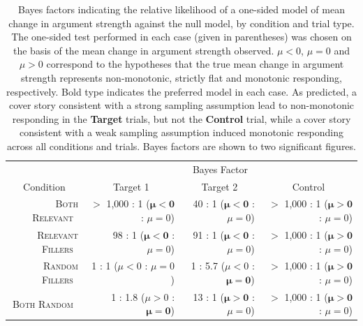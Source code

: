 \documentclass[doc,12pt]{apa}
\newcommand{\relevant}{\textsc{Both Relevant}}
\newcommand{\relevantdata}{\textsc{Relevant Fillers}}
\newcommand{\randomdata}{\textsc{Random Fillers}}
\newcommand{\random}{\textsc{Both Random}}
\newcommand{\monowin}[2]{{#1} : {#2} \scriptsize{($\bm{\mu > 0}$ : $\mu=0$)}}
\newcommand{\monolose}[2]{{#1} : {#2} \scriptsize{($\mu > 0$ : $\bm{\mu=0}$)}}
\newcommand{\nonmonowin}[2]{{#1} : {#2} \scriptsize{($\bm{\mu<0}$ : $\mu=0$)}}
\newcommand{\nonmonolose}[2]{{#1} : {#2} \scriptsize{($\mu<0$ : $\bm{\mu=0}$)}}
\newcommand{\nonmonodraw}[2]{{#1} : {#2} \scriptsize{($\mu<0$ : $\mu=0$)}}
\begin{document}
\begin{table}[t]
\hspace{-5mm}
\footnotesize
\begin{tabular}{rrrr}
\toprule
 & \multicolumn{3}{c}{Bayes Factor} \\
\cmidrule{2-4}
\multicolumn{1}{c}{Condition} & \multicolumn{1}{c}{Target 1} & \multicolumn{1}{c}{Target 2} & \multicolumn{1}{c}{Control} \\
\midrule
\relevant\ &  \nonmonowin{$>$ 1,000}{1} & \nonmonowin{40}{1} & \monowin{$>$ 1,000}{1} \\
\relevantdata\ & \nonmonowin{98}{1} & \nonmonowin{91}{1} & \monowin{$>$ 1,000}{1} \\
\randomdata\ & \nonmonodraw{1}{1} & \nonmonolose{1}{5.7} & \monowin{$>$ 1,000}{1} \\
\random\ & \monolose{1}{1.8} & \monowin{13}{1} & \monowin{$>$ 1,000}{1} \\
\bottomrule
\end{tabular}
\vspace{-5mm}
\caption{%
Bayes factors indicating the relative likelihood of a one-sided model of mean change in argument strength against the null model, by condition and trial type. The one-sided test performed in each case (given in parentheses) was chosen on the basis of the mean change in argument strength observed. $\mu<0$, $\mu=0$ and $\mu > 0$ correspond to the hypotheses that the true mean change in argument strength represents non-monotonic, strictly flat and monotonic responding, respectively. Bold type indicates the preferred model in each case. As predicted, a cover story consistent with a strong sampling assumption lead to non-monotonic responding in the {\bf Target} trials, but not the {\bf Control} trial, while a cover story consistent with a weak sampling assumption induced monotonic responding across all conditions and trials. Bayes factors are shown to two significant figures.
}
\label{tbl:monobayesfactors}
\end{table}

\end{document}
